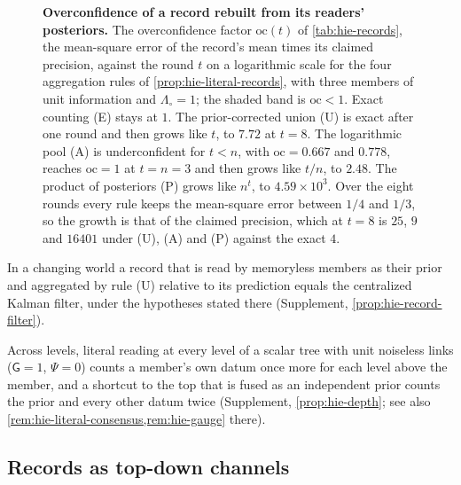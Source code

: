 \begin{figure}[t]
  \centering
  
  \caption{\textbf{Overconfidence of a record rebuilt from its readers' posteriors.} The overconfidence factor $\mathrm{oc}(t)$ of \cref{tab:hie-records}, the mean-square error of the record's mean times its claimed precision, against the round $t$ on a logarithmic scale for the four aggregation rules of \cref{prop:hie-literal-records}, with three members of unit information and $\Lambda_\circ=1$; the shaded band is $\mathrm{oc}<1$. Exact counting (E) stays at $1$. The prior-corrected union (U) is exact after one round and then grows like $t$, to $7.72$ at $t=8$. The logarithmic pool (A) is underconfident for $t<n$, with $\mathrm{oc}=0.667$ and $0.778$, reaches $\mathrm{oc}=1$ at $t=n=3$ and then grows like $t/n$, to $2.48$. The product of posteriors (P) grows like $n^t$, to $4.59\times10^3$. Over the eight rounds every rule keeps the mean-square error between $1/4$ and $1/3$, so the growth is that of the claimed precision, which at $t=8$ is $25$, $9$ and $16401$ under (U), (A) and (P) against the exact $4$.}
  \label{fig:hie-overconfidence}
\end{figure}

In a changing world a record that is read by memoryless members as their prior and aggregated by rule (U) relative to its prediction equals the centralized Kalman filter, under the hypotheses stated there (Supplement, \cref{prop:hie-record-filter}).

Across levels, literal reading at every level of a scalar tree with unit noiseless links ($\mathsf G=1$, $\Psi=0$) counts a member's own datum once more for each level above the member, and a shortcut to the top that is fused as an independent prior counts the prior and every other datum twice (Supplement, \cref{prop:hie-depth}; see also \cref{rem:hie-literal-consensus,rem:hie-gauge} there).

\subsection{Records as top-down channels}\label{sec:hie-records}

